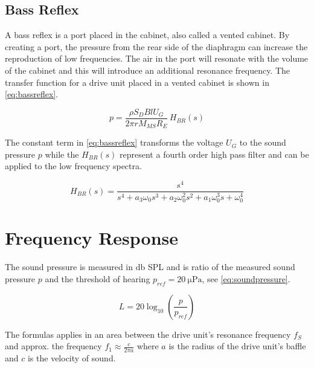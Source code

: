 \subsection{Bass Reflex}
A bass reflex is a port placed in the cabinet, also called a vented cabinet.
By creating a port, the pressure from the rear side of the diaphragm can increase the reproduction of low frequencies.
The air in the port will resonate with the volume of the cabinet and this will introduce an additional resonance frequency. \cite[p.~53]{Elektroakustik}
The transfer function for a drive unit placed in a vented cabinet is shown in \cref{eq:bassreflex}.

\begin{equation}
p = \frac{\rho S_D B l U_G}{2\pi r M_{MS} R_E}\,H_{BR}(s)
\label{eq:bassreflex}
\end{equation}

The constant term in \cref{eq:bassreflex} transforms the voltage $U_G$ to the sound pressure $p$ while the $H_{BR}(s)$ represent a fourth order high pass filter and can be applied to the low frequency spectra. \cite[p.~55]{Elektroakustik}

\begin{equation}
H_{BR}(s) = \frac{s^4}{s^4+a_3\omega_0s^3+a_2\omega_0^2s^2+a_1\omega_0^3s+\omega_0^4}
\label{eq:brtf}
\end{equation}

\section{Frequency Response}
The sound pressure is measured in \si{\decibel} SPL and is ratio of the measured sound pressure $p$ and the threshold of hearing $p_{ref}=\SI{20}{\micro\pascal}$, see \cref{eq:soundpressure}.

\begin{equation}
L=20\log_{10}\left(\frac{p}{p_{ref}}\right)
\label{eq:soundpressure}
\end{equation}

The formulas applies in an area between the drive unit's resonance frequency $f_S$ and approx. the frequency $f_1\approx\frac{c}{2\pi a}$ where $a$ is the radius of the drive unit's baffle and $c$ is the velocity of sound. \cite[p.~41]{Elektroakustik}



\FloatBarrier
